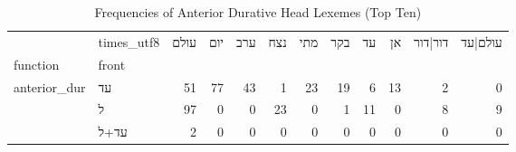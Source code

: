 \begin{table}[htbp!]
\centering
\caption{Frequencies of Anterior Durative Head Lexemes (Top Ten)}
\label{table:antdurheads_ct}
\begin{tabular}{llrrrrrrrrrr}
\toprule
             & times\_utf8 &  עולם &  יום &  ערב &  נצח &  מתי &  בקר &  עד &  אן &  דור|דור &  עולם|עד \\
function & front &       &      &      &      &      &      &     &     &          &          \\
\midrule
anterior\_dur & עד &    51 &   77 &   43 &    1 &   23 &   19 &   6 &  13 &        2 &        0 \\
             & ל &    97 &    0 &    0 &   23 &    0 &    1 &  11 &   0 &        8 &        9 \\
             & עד+ל &     2 &    0 &    0 &    0 &    0 &    0 &   0 &   0 &        0 &        0 \\
\bottomrule
\end{tabular}
\end{table}
